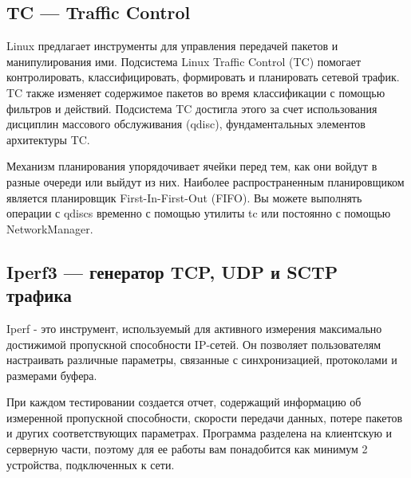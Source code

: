 \subsection{TC --- Traffic Control}
\label{chap1:sec4:sub1}

Linux предлагает инструменты для управления передачей пакетов и манипулирования
ими. Подсистема Linux Traffic Control (TC) помогает контролировать,
классифицировать, формировать и планировать сетевой трафик. TC также изменяет
содержимое пакетов во время классификации с помощью фильтров и действий.
Подсистема TC достигла этого за счет использования дисциплин массового
обслуживания (qdisc), фундаментальных элементов архитектуры TC. 

Механизм планирования упорядочивает ячейки перед тем, как они войдут в разные
очереди или выйдут из них. Наиболее распространенным планировщиком является
планировщик First-In-First-Out (FIFO). Вы можете выполнять операции с qdiscs
временно с помощью утилиты tc или постоянно с помощью NetworkManager.

\subsection{Iperf3 --- генератор TCP, UDP и SCTP трафика}
\label{chap1:sec4:sub2}

Iperf - это инструмент, используемый для активного измерения максимально
достижимой пропускной способности IP-сетей. Он позволяет пользователям
настраивать различные параметры, связанные с синхронизацией, протоколами и
размерами буфера. 

При каждом тестировании создается отчет, содержащий информацию об измеренной
пропускной способности, скорости передачи данных, потере пакетов и других
соответствующих параметрах. Программа разделена на клиентскую и серверную
части, поэтому для ее работы вам понадобится как минимум 2 устройства,
подключенных к сети. 


